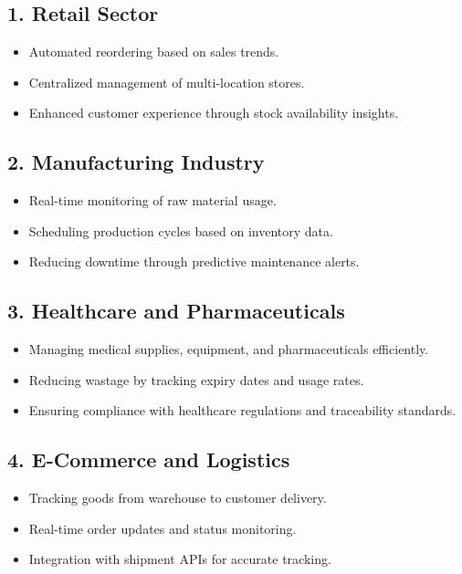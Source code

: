 \documentclass[12pt,a4paper]{article}
\begin{document}
\subsection*{1. Retail Sector}
\begin{itemize}
    \item Automated reordering based on sales trends.
    \item Centralized management of multi-location stores.
    \item Enhanced customer experience through stock availability insights.
\end{itemize}

\subsection*{2. Manufacturing Industry}
\begin{itemize}
    \item Real-time monitoring of raw material usage.
    \item Scheduling production cycles based on inventory data.
    \item Reducing downtime through predictive maintenance alerts.
\end{itemize}

\subsection*{3. Healthcare and Pharmaceuticals}
\begin{itemize}
    \item Managing medical supplies, equipment, and pharmaceuticals efficiently.
    \item Reducing wastage by tracking expiry dates and usage rates.
    \item Ensuring compliance with healthcare regulations and traceability standards.
\end{itemize}

\subsection*{4. E-Commerce and Logistics}
\begin{itemize}
    \item Tracking goods from warehouse to customer delivery.
    \item Real-time order updates and status monitoring.
    \item Integration with shipment APIs for accurate tracking.
\end{itemize}
\end{document}
